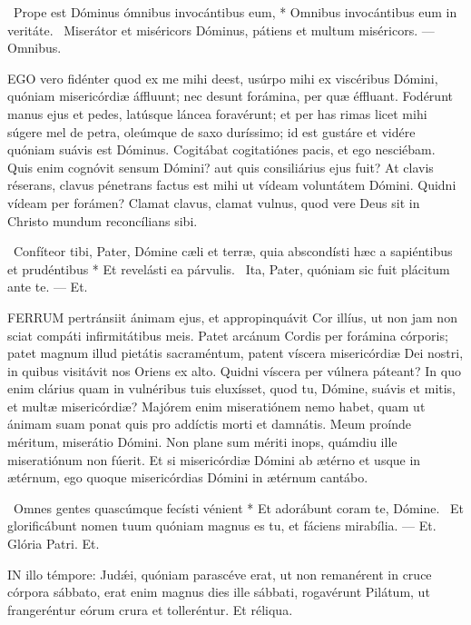 \R\ Prope est Dóminus ómnibus invocántibus eum, * Omnibus invocántibus eum in veritáte. \V\ Miserátor et miséricors Dóminus, pátiens et multum miséricors. --- Omnibus.


\lettrine[lines=2]{E}{GO} vero fidénter quod ex me mihi deest, usúrpo mihi ex viscéribus Dómini, quóniam misericórdiæ áffluunt; nec desunt forámina, per quæ éffluant. Fodérunt manus ejus et pedes, latúsque láncea foravérunt; et per has rimas licet mihi súgere mel de petra, oleúmque de saxo duríssimo; id est gustáre et vidére quóniam suávis est Dóminus. Cogitábat cogitatiónes pacis, et ego nesciébam. Quis enim cognóvit sensum Dómini? aut quis consiliárius ejus fuit? At clavis réserans, clavus pénetrans factus est mihi ut vídeam voluntátem Dómini. Quidni vídeam per forámen? Clamat clavus, clamat vulnus, quod vere Deus sit in Christo mundum reconcílians sibi.

\R\ Confíteor tibi, Pater, Dómine cæli et terræ, quia abscondísti hæc a sapiéntibus et prudéntibus * Et revelásti ea párvulis. \V\ Ita, Pater, quóniam sic fuit plácitum ante te. --- Et.


\lettrine[lines=2]{F}{ERRUM} pertránsiit ánimam ejus, et appropinquávit Cor illíus, ut non jam non sciat compáti infirmitátibus meis. Patet arcánum Cordis per forámina córporis; patet magnum illud pietátis sacraméntum, patent víscera misericórdiæ Dei nostri, in quibus visitávit nos Oriens ex alto. Quidni víscera per vúlnera páteant? In quo enim clárius quam in vulnéribus tuis eluxísset, quod tu, Dómine, suávis et mitis, et multæ misericórdiæ? Majórem enim miseratiónem nemo habet, quam ut ánimam suam ponat quis pro addíctis morti et damnátis. Meum proínde méritum, miserátio Dómini. Non plane sum mériti inops, quámdiu ille miseratiónum non fúerit. Et si misericórdiæ Dómini ab ætérno et usque in ætérnum, ego quoque misericórdias Dómini in ætérnum cantábo.

\R\ Omnes gentes quascúmque fecísti vénient * Et adorábunt coram te, Dómine. \V\ Et glorificábunt nomen tuum quóniam magnus es tu, et fáciens mirabília. --- Et. Glória Patri. Et.




\lettrine[lines=2]{I}{N} illo témpore: Judǽi, quóniam parascéve erat, ut non remanérent in cruce córpora sábbato, erat enim magnus dies ille sábbati, rogavérunt Pilátum, ut frangeréntur eórum crura et tolleréntur. Et réliqua.

